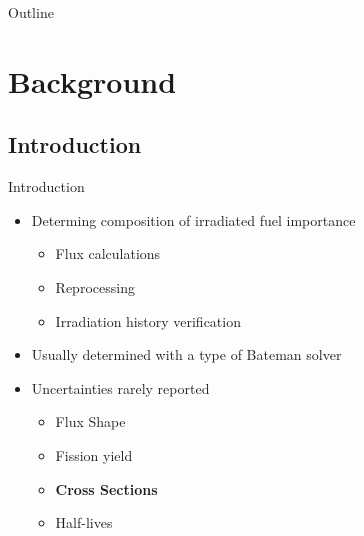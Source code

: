 \documentclass{beamer}
\begin{document}




\begin{frame}{Outline}
\tableofcontents
\end{frame}

\section{Background}
\subsection{Introduction}
\begin{frame}{Introduction}
  \begin{itemize}
  \item{Determing composition of irradiated fuel importance}
    \begin{itemize}
    \item{Flux calculations}
    \item{Reprocessing}
    \item{Irradiation history verification}
    \end{itemize}
  \item{Usually determined with a type of Bateman solver}
  \item{Uncertainties rarely reported}
    \begin{itemize}
    \item{Flux Shape}
    \item{Fission yield}
    \item{\textbf{Cross Sections}}
    \item{Half-lives}
    \end{itemize}
  \end{itemize}
\end{frame}
\end{document}
